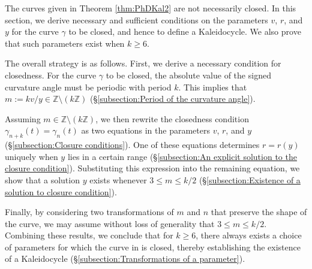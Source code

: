 \documentclass[10pt,leqno]{amsart}
\numberwithin{equation}{section}
\begin{document}
The curves given in Theorem \ref{thm:PhDKal2} are not necessarily closed.
In this section, we derive necessary and sufficient conditions on the parameters $v$, $r$, and $y$ for the curve $\gamma$ to be closed, and hence to define a Kaleidocycle.
We also prove that such parameters exist when $k \geq 6$.

The overall strategy is as follows.
First, we derive a necessary condition for closedness.
For the curve $\gamma$ to be closed, the absolute value of the signed curvature angle must be periodic with period $k$.
This implies that $m := kv/y \in \mathbb{Z} \setminus (k\mathbb{Z})$ (\S\ref{subsection:Period of the curvature angle}).

Assuming $m \in \mathbb{Z} \setminus (k\mathbb{Z})$, we then rewrite the closedness condition $\gamma_{n+k}(t) = \gamma_n(t)$ as two equations in the parameters $v$, $r$, and $y$ (\S\ref{subsection:Closure conditions}).
One of these equations determines $r = r(y)$ uniquely when $y$ lies in a certain range (\S\ref{subsection:An explicit solution to the closure condition}).
Substituting this expression into the remaining equation, we show that a solution $y$ exists whenever $3 \leq m \leq k/2$ (\S\ref{subsection:Existence of a solution to closure condition}).

Finally, by considering two transformations of $m$ and $n$ that preserve the shape of the curve, we may assume without loss of generality that $3 \leq m \leq k/2$.
Combining these results, we conclude that for $k \geq 6$, there always exists a choice of parameters for which the curve in  is closed, thereby establishing the existence of a Kaleidocycle (\S\ref{subsection:Transformations of a parameter}).
\end{document}
